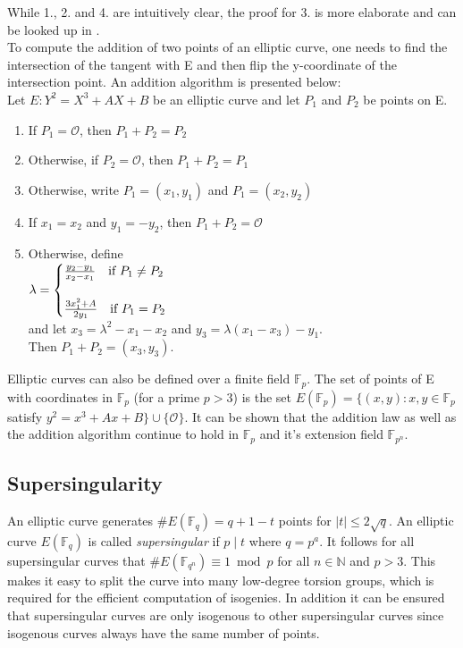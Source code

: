While 1., 2. and 4. are intuitively clear, the proof for 3. is more elaborate and can be looked up in .\\ %

To compute the addition of two points of an elliptic curve, one needs to find the intersection of the tangent with E and then flip the y-coordinate of the intersection point. An addition algorithm is presented below: \\

Let $E : Y^2 = X^3 + AX + B$ be an elliptic curve and let $P_1$ and $P_2$ be points on E.
\begin{enumerate}[1.]
	\item If $P_1 = \mathcal{O}$, then $P_1 + P_2 = P_2$
	\item Otherwise, if $P_2=\mathcal{O}$, then $P_1 + P_2 = P_1$
	\item Otherwise, write $P_1 = (x_1,y_1)$ and $P_1 = (x_2,y_2)$
	\item If $x_1 = x_2$ and $y_1=-y_2$, then $P_1+P_2=\mathcal{O}$
	\item Otherwise, define \\
	\qquad \qquad \qquad$\lambda =
	\begin{cases}
	\frac{y_2-y_1}{x_2-x_1}\text{\quad if }P_1 \neq P_2\\
	\\
	\frac{3x_1^2 +A}{2y_1}\text{\quad if }P_1=P_2 
	\end{cases}$\\
	\vspace{5mm}
	and let $x_3=\lambda^2-x_1-x_2$ and $y_3=\lambda(x_1-x_3)-y_1$.\\
	\vspace{5mm}
	Then $P_1+P_2=(x_3,y_3)$.
\end{enumerate}

Elliptic curves can also be defined over a finite field $\mathbb{F}_p$. The set of points of E with coordinates in $\mathbb{F}_p$ (for a prime $p>3$) is the set $E(\mathbb{F}_p)=\{(x,y):x,y\in \mathbb{F}_p$ satisfy $y^2=x^3+Ax+B \} \cup \{\mathcal{O}\}$. It can be shown that the addition law as well as the addition algorithm continue to hold in  $\mathbb{F}_p$ and it's extension field $\mathbb{F}_{p^n}$.


\subsection{Supersingularity}

An elliptic curve generates $\#E(\mathbb{F}_q) = q+1-t$ points for $|t|\leq 2\sqrt{q}$. An elliptic curve $E(\mathbb{F}_q)$ is called \textit{supersingular} if $p \mid t$ where $q=p^a$. It follows for all supersingular curves that $\#E(\mathbb{F}_{q^n})\equiv 1 \bmod p$ for all $n\in \mathbb{N}$ and $p>3$. This makes it easy to split the curve into many low-degree torsion groups, which is required for the efficient computation of isogenies. In addition it can be ensured that supersingular curves are only isogenous to other supersingular curves since isogenous curves always have the same number of points.\\ %

